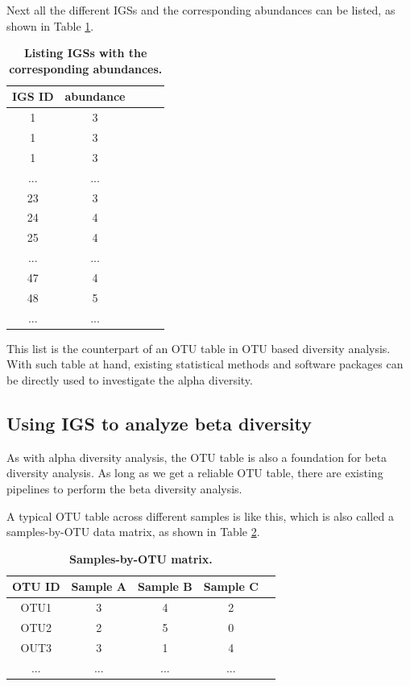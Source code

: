 Next all the different IGSs and the corresponding abundances can be listed,
as shown in Table \ref{table:igs_abundance}. 

\begin{table}[!ht]
\centering
\begin{tabular}{ |c | c |c| c|c| }
\hline 
IGS ID & abundance \\
\hline 
1                   & 3  \\
1                 & 3  \\
1                  & 3 \\
...        & ... \\
23        & 3 \\
24        & 4 \\
25        & 4 \\
...        & ... \\
47        & 4 \\
48        & 5 \\
...        & ... \\
\hline 
\end{tabular}
\caption{\bf Listing IGSs with the corresponding abundances.}
\label{table:igs_abundance}
\end{table}

This list is the counterpart of an 
OTU table in OTU based diversity analysis.
With such table at hand, existing statistical methods and software 
packages can be directly used to investigate the alpha diversity.  

\subsection{Using IGS to analyze beta diversity}

As with alpha diversity analysis, the OTU table is also a foundation for beta 
diversity analysis. As long as we get a reliable OTU table, there are existing 
pipelines to perform the beta diversity analysis. 

A typical OTU table across different samples is like this, which is also 
called a samples-by-OTU data matrix, as shown in Table \ref{table:OTU_table}.

\begin{table}[!ht]
\centering
\begin{tabular}{ |c | c |c| c|c| }
\hline 
    OTU ID & Sample A & Sample B & Sample C \\
\hline 
OTU1 & 3 & 4 & 2  \\
OTU2 & 2 & 5 & 0 \\
OUT3 & 3 & 1 & 4 \\
...  & ... & ... & ... \\
\hline 
\end{tabular}
\begin{flushleft}
\end{flushleft}
\caption{\bf Samples-by-OTU matrix.}
\label{table:OTU_table}
\end{table}

